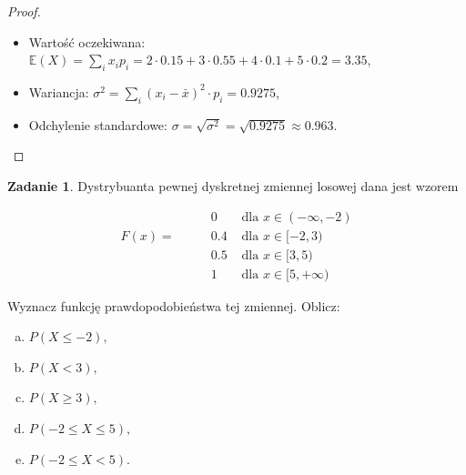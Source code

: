 \documentclass[11pt]{article}
\theoremstyle{definition}
\newtheorem{zadanie}{Zadanie}
\numberwithin{zadanie}{section}
\begin{document}
\begin{proof}
\begin{enumerate}[a)]
              \begin{itemize}
                  \item Wartość oczekiwana: $\mathbb E(X)= \sum_i x_ip_i = 2\cdot0.15+3\cdot0.55+4\cdot0.1+5\cdot0.2 = 3.35$,
                  \item Wariancja: $\sigma^2 = \sum_i(x_i-\bar x)^2\cdot p_i= 0.9275$,
                  \item Odchylenie standardowe: $\sigma = \sqrt{\sigma^2} = \sqrt{0.9275} \approx 0.963$.
              \end{itemize}

    \end{enumerate}
\end{proof}

\begin{zadanie}

    Dystrybuanta pewnej dyskretnej zmiennej losowej dana jest wzorem

    \begin{align*}
                       & 0   & \text{ dla } x \in (-\infty, -2) \\
        F (x)  =\qquad & 0.4 & \text{ dla } x \in [-2, 3)       \\
                       & 0.5 & \text{ dla } x \in [3, 5)        \\
                       & 1   & \text{ dla } x \in [5, +\infty)
    \end{align*}

    Wyznacz funkcję prawdopodobieństwa tej zmiennej. Oblicz:
    \begin{enumerate}[a)]
        \item $P (X \leq -2),$
        \item $P (X < 3),$
        \item $P (X \geq 3),$
        \item $P (-2 \leq X \leq 5),$
        \item $P (-2 \leq X < 5).$
    \end{enumerate}
\end{zadanie}
\end{document}
